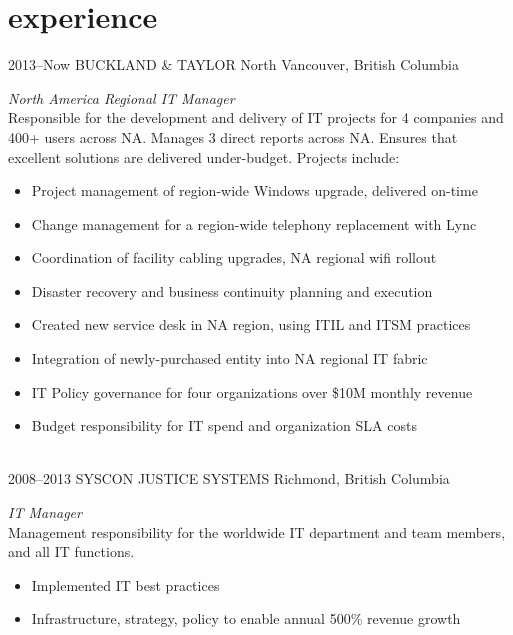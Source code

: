 \documentclass[]{friggeri-cv} %
\begin{document}

\section{experience}

\begin{entrylist}
\entry
{2013--Now}
{BUCKLAND \& TAYLOR}
{North Vancouver, British Columbia}
{\emph{North America Regional IT Manager} \\
Responsible for the development and delivery of IT projects for 4 companies and 400+ users across NA. Manages 3 direct reports across NA. Ensures that excellent solutions are delivered under-budget. Projects include: \\
\begin{itemize}
\item Project management of region-wide Windows upgrade, delivered on-time
\item Change management for a region-wide telephony replacement with Lync
\item Coordination of facility cabling upgrades, NA regional wifi rollout
\item Disaster recovery and business continuity planning and execution
\item Created new service desk in NA region, using ITIL and ITSM practices
\item Integration of newly-purchased entity into NA regional IT fabric
\item IT Policy governance for four organizations over \$10M monthly revenue
\item Budget responsibility for IT spend and organization SLA costs
\end{itemize}}
\\
\entry
{2008--2013}
{SYSCON JUSTICE SYSTEMS}
{Richmond, British Columbia}
{\emph{IT Manager} \\
Management responsibility for the worldwide IT department and team members, and all IT functions. \\
\begin{itemize}
\item Implemented IT best practices
\item Infrastructure, strategy, policy to enable annual 500\% revenue growth

\end{itemize}}
\end{entrylist}
\end{document}
